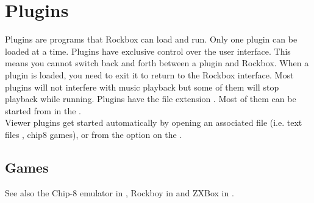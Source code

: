 \chapter{Plugins}\label{ref:plugins}
Plugins are programs that Rockbox can load and run. Only one plugin can
be loaded at a time. Plugins have exclusive control over the user interface.
This means you cannot switch back and forth between a plugin and Rockbox. When
a plugin is loaded, you need to exit it to return to the Rockbox interface.
Most plugins will not interfere with music playback but some of them will stop
playback while running. Plugins have the file extension . Most of
them can be started from  in the .\\

Viewer plugins get started automatically by opening an associated file (i.e.
text files%
, chip8 games), or from the  option on the .

\section{Games}
  See also the Chip{}-8 emulator in ,
  {Rockboy in }
  and ZXBox in .






















